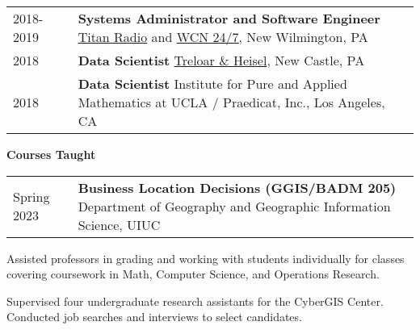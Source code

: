 \documentclass{acmcv}
\begin{document}
\pagebreak


\begin{longtable}{p{0.16\linewidth} p{0.84\linewidth}}
    2018-2019 & \textbf{Systems Administrator and Software Engineer} \newline \href{http://titanradio.net/}{Titan Radio} and \href{https://www.wcn247.com/}{WCN 24/7}, New Wilmington, PA\\

    2018 & \textbf{Data Scientist} \newline \href{http://treloaronline.com/}{Treloar \& Heisel}, New Castle, PA\\

    2018 & \textbf{Data Scientist} \newline Institute for Pure and Applied Mathematics at UCLA / Praedicat, Inc., Los Angeles, CA\\
\end{longtable}
    

    \textbf{Courses Taught}\vspace*{-0.25cm}

    \begin{longtable}{p{0.16\linewidth} p{0.84\linewidth}}
        Spring 2023 & \textbf{Business Location Decisions (GGIS/BADM 205)} \newline Department of Geography and Geographic Information Science, UIUC \\

    \end{longtable}

    \begin{titemize}
    	\titem Assisted professors in grading and working with students individually for classes covering coursework in Math, Computer Science, and Operations Research.
    \end{titemize}

    \begin{titemize}
        \titem Supervised four undergraduate research assistants for the CyberGIS Center.
        \titem Conducted job searches and interviews to select candidates.
    \end{titemize}
\end{document}
